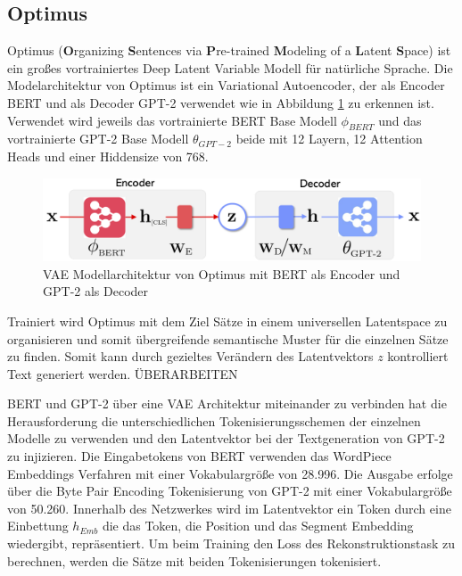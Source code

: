\subsection{Optimus}
Optimus (\textbf{O}rganizing \textbf{S}entences via \textbf{P}re-trained \textbf{M}odeling of a \textbf{L}atent \textbf{S}pace) \citep{DBLP:journals/corr/abs-2004-04092} ist ein großes vortrainiertes Deep Latent Variable Modell für natürliche Sprache.
Die Modelarchitektur von Optimus ist ein Variational Autoencoder, der als Encoder BERT und als Decoder GPT-2 verwendet wie in Abbildung \ref{optimus_scheme_fig} zu erkennen ist. 
Verwendet wird jeweils das vortrainierte BERT Base Modell $\phi_{BERT}$ und das vortrainierte GPT-2 Base Modell $\theta_{GPT-2}$ beide mit 12 Layern, 12 Attention Heads und einer Hiddensize von 768. 
\begin{figure}[h]
    \centering
    \includegraphics[width=\textwidth]{bilder/optimus_scheme}
    \caption{VAE Modellarchitektur von Optimus mit BERT als Encoder und GPT-2 als Decoder \citep{DBLP:journals/corr/abs-2004-04092}}
    \label{optimus_scheme_fig}
\end{figure}
Trainiert wird Optimus mit dem Ziel Sätze in einem universellen Latentspace zu organisieren und somit übergreifende semantische Muster für die einzelnen Sätze zu finden.
Somit kann durch gezieltes Verändern des Latentvektors $z$ kontrolliert Text generiert werden. ÜBERARBEITEN

BERT und GPT-2 über eine VAE Architektur miteinander zu verbinden hat die Herausforderung die unterschiedlichen Tokenisierungsschemen der einzelnen Modelle zu verwenden und den Latentvektor bei der Textgeneration von GPT-2 zu injizieren. 
Die Eingabetokens von BERT verwenden das WordPiece Embeddings Verfahren \citep{wordpiece} mit einer Vokabulargröße von 28.996. 
Die Ausgabe erfolge über die Byte Pair Encoding Tokenisierung \citep{bytepairencoding} von GPT-2 mit einer Vokabulargröße von 50.260. 
Innerhalb des Netzwerkes wird im Latentvektor ein Token durch eine Einbettung $h_{Emb}$ die das Token, die Position und das Segment Embedding wiedergibt, repräsentiert.
Um beim Training den Loss des Rekonstruktionstask zu berechnen, werden die Sätze mit beiden Tokenisierungen tokenisiert.


